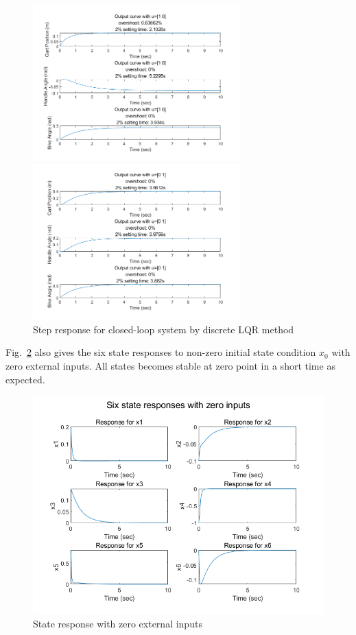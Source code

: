 \documentclass[hyperref]{article}
\theoremstyle{nonumberplain}
\begin{document}
	\begin{figure}[htbp]
		\centering
		\begin{minipage}[t]{0.48\textwidth}
			\centering
			\includegraphics[width=8cm]{fig15.png}
		\end{minipage}
		\begin{minipage}[t]{0.48\textwidth}
			\centering
			\includegraphics[width=8cm]{fig14.png}
		\end{minipage}
		\caption{Step response for closed-loop system by discrete LQR method}
		\label{fig11}
	\end{figure}

	Fig.~\ref{fig12} also gives the six state responses to non-zero initial state condition $x_{0}$ with zero external inputs. All states becomes stable at zero point in a short time as expected.
	
	\begin{figure}[htbp]
		\centering
		\includegraphics[width=0.6\linewidth]{fig16.png}
		\caption{State response with zero external inputs}
		\label{fig12}
	\end{figure}
	
\end{document}
